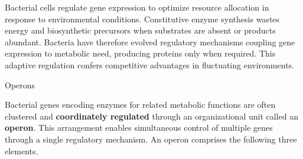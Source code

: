 \documentclass[10pt]{article}
\begin{document}
    Bacterial cells regulate gene expression to optimize resource allocation in response to environmental conditions. Constitutive enzyme synthesis wastes energy and biosynthetic precursors when substrates are absent or products abundant. Bacteria have therefore evolved regulatory mechanisms coupling gene expression to metabolic need, producing proteins only when required. This adaptive regulation confers competitive advantages in fluctuating environments.

    \begin{core}{Operons}

      Bacterial genes encoding enzymes for related metabolic functions are often clustered and \textbf{coordinately regulated} through an organizational unit called an \textbf{operon}. This arrangement enables simultaneous control of multiple genes through a single regulatory mechanism. An operon comprises the following three elements.

\end{core}
\end{document}
